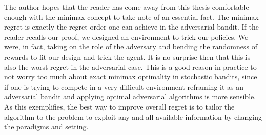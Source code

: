 \par The author hopes that the reader has come away from this thesis comfortable enough with the minimax concept to take note of an essential fact. The minimax regret is exactly the regret order one can achieve in the adversarial bandit. If the reader recalls our proof, we designed an environment to trick our policies. We were, in fact, taking on the role of the adversary and bending the randomness of rewards to fit our design and trick the agent. It is no surprise then that this is also the worst regret in the adversarial case. This is a good reason in practice to not worry too much about exact minimax optimality in stochastic bandits, since if one is trying to compete in a very difficult environment reframing it as an adversarial bandit and applying optimal adversarial algorithms is more sensible. As this exemplifies, the best way to improve overall regret is to tailor the algorithm to the problem to exploit any and all available information by changing the paradigms and setting.














































